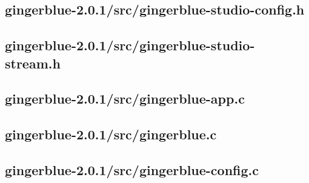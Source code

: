 \documentclass[UKenglish]{ifimaster}  %
\begin{document}
\begin{scriptsize}
  
  
  
\end{scriptsize}

\subsection{gingerblue-2.0.1/src/gingerblue-studio-config.h}

\begin{scriptsize}
  
  

\end{scriptsize}

\subsection{gingerblue-2.0.1/src/gingerblue-studio-stream.h}

\begin{scriptsize}
  
  
  
\end{scriptsize}

\subsection{gingerblue-2.0.1/src/gingerblue-app.c}

\begin{scriptsize}
  
  
  
\end{scriptsize}

\subsection{gingerblue-2.0.1/src/gingerblue.c}

\begin{scriptsize}
  
  
  
\end{scriptsize}

\subsection{gingerblue-2.0.1/src/gingerblue-config.c}
\end{document}
